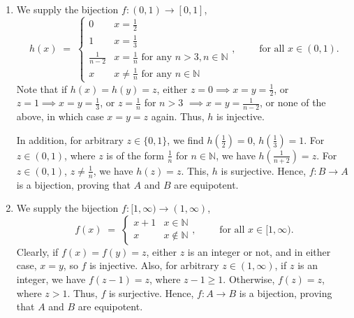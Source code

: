 \documentclass[10pt]{article}
\begin{document}
\begin{enumerate}
                \item We supply the bijection $f\colon (0, 1) \to [0, 1]$,
                \[
                h(x) \;=\; \begin{cases}
                        0               &       x = \frac{1}{2} \\
                        1               &       x = \frac{1}{3} \\
                        \frac{1}{n - 2} &       x = \frac{1}{n} \text{ for any } n > 3, n \in \mathbb{N} \\
                        x               &       x \neq \frac{1}{n} \text{ for any } n \in \mathbb{N}
                \end{cases}, \quad\quad\text{ for all }x \in (0, 1).
                \]
                Note that if $h(x) = h(y) = z$, either $z = 0 \implies x = y = \frac{1}{2}$, or $z = 1 \implies x = y = \frac{1}{3}$,
                or $z = \frac{1}{n}$ for $n > 3$ $\implies x = y = \frac{1}{n-2}$, or none of the above, in which case $x = y = z$ again.
                Thus, $h$ is injective.
                
                In addition, for arbitrary $z \in \{0, 1\}$, we find $h(\frac{1}{2}) = 0$, $h(\frac{1}{3}) = 1$. For $z \in (0, 1)$, where
                $z$ is of the form $\frac{1}{n}$ for $n \in \mathbb{N}$, we have $h(\frac{1}{n + 2}) = z$. For $z \in (0, 1)$, $z \neq \frac{1}{n}$,
                we have $h(z) = z$. This, $h$ is surjective.
                Hence, $f\colon B\to A$ is a bijection, proving that $A$ and $B$ are equipotent.

                \item We supply the bijection $f\colon [1, \infty) \to (1, \infty)$,
                \[
                f(x) \;=\; \begin{cases}
                        x + 1   &       x \in \mathbb{N} \\
                        x       &       x \notin \mathbb{N}
                \end{cases}, \quad\quad\text{ for all }x \in [1, \infty).
                \]
                Clearly, if $f(x) = f(y) = z$, either $z$ is an integer or not, and in either case, $x = y$, so $f$ is injective.
                Also, for arbitrary $z \in (1, \infty)$, if $z$ is an integer, we have $f(z - 1) = z$, where $z - 1 \geq 1$.
                Otherwise, $f(z) = z$, where $z > 1$. Thus, $f$ is surjective.
                Hence, $f\colon A\to B$ is a bijection, proving that $A$ and $B$ are equipotent.
        \end{enumerate}
\end{document}
